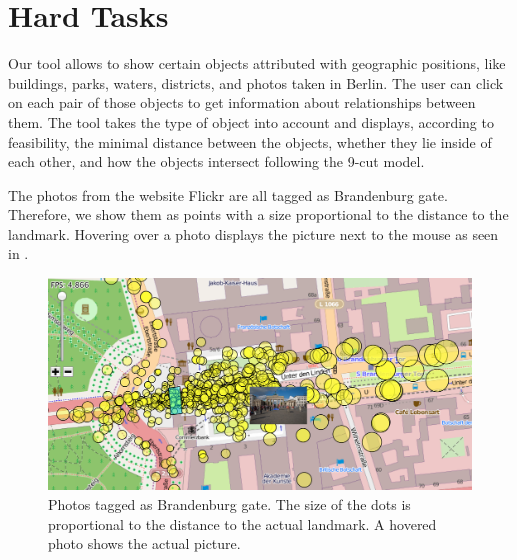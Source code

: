 \section*{Hard Tasks}
Our tool allows to show certain objects attributed with
geographic positions, like buildings, parks, waters, districts, and
photos taken in Berlin.
The user can click on each pair of those objects to get information about
relationships between them.
The tool takes the type of object into account and displays, according
to feasibility, the minimal distance between the objects, whether they lie
inside of each other, and how the objects intersect following the 9-cut model.

The photos from the website Flickr are all tagged as Brandenburg gate.
Therefore, we show them as points with a size proportional to
the distance to the landmark.
Hovering over a photo displays the picture next to the mouse
as seen in .

\begin{figure}[b]
\centering
\includegraphics[width=0.9\linewidth]{imgs/brand}
\caption{Photos tagged as Brandenburg gate. The size of the dots
is proportional to the distance to the actual landmark.
A hovered photo shows the actual picture.}
\label{fig:brandenburg}
\end{figure}


